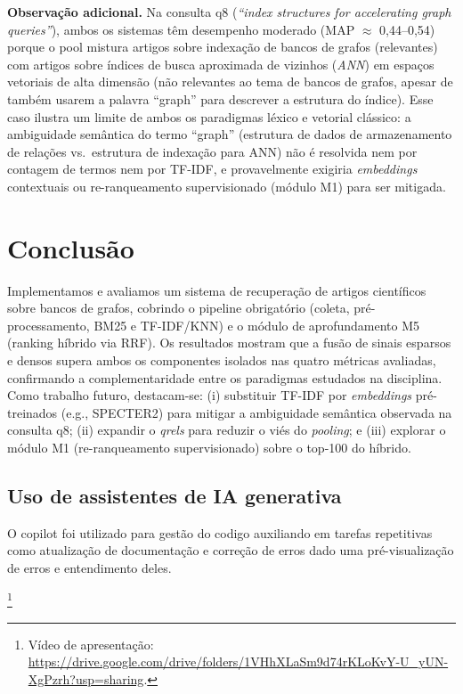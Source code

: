 \documentclass[12pt]{article}
\begin{document}
\textbf{Observação adicional.} Na consulta q8 (\textit{``index structures
for accelerating graph queries''}), ambos os sistemas têm desempenho
moderado (MAP $\approx$ 0,44--0,54) porque o pool mistura artigos sobre
indexação de bancos de grafos (relevantes) com artigos sobre índices de
busca aproximada de vizinhos (\textit{ANN}) em espaços vetoriais de alta
dimensão (não relevantes ao tema de bancos de grafos, apesar de também
usarem a palavra ``graph'' para descrever a estrutura do índice). Esse caso
ilustra um limite de ambos os paradigmas léxico e vetorial clássico: a
ambiguidade semântica do termo ``graph'' (estrutura de dados de armazenamento
de relações vs.\ estrutura de indexação para ANN) não é resolvida nem por
contagem de termos nem por TF-IDF, e provavelmente exigiria
\textit{embeddings} contextuais ou re-ranqueamento supervisionado (módulo
M1) para ser mitigada.

\section{Conclusão}

Implementamos e avaliamos um sistema de recuperação de artigos científicos
sobre bancos de grafos, cobrindo o pipeline obrigatório (coleta, pré-processamento, BM25 e TF-IDF/KNN) e o módulo de aprofundamento M5 (ranking
híbrido via RRF). Os resultados mostram que a fusão de sinais esparsos e
densos supera ambos os componentes isolados nas quatro métricas avaliadas,
confirmando a complementaridade entre os paradigmas estudados na disciplina.
Como trabalho futuro, destacam-se: (i) substituir TF-IDF por
\textit{embeddings} pré-treinados (e.g., SPECTER2) para mitigar a
ambiguidade semântica observada na consulta q8; (ii) expandir o
\textit{qrels} para reduzir o viés do \textit{pooling}; e (iii) explorar o
módulo M1 (re-ranqueamento supervisionado) sobre o top-100 do híbrido.

\subsection*{Uso de assistentes de IA generativa}

O copilot foi utilizado para gestão do codigo auxiliando em tarefas repetitivas como atualização de documentação e correção de erros
dado uma pré-visualização de erros e entendimento deles.


\footnote{Vídeo de apresentação: \url{https://drive.google.com/drive/folders/1VHhXLaSm9d74rKLoKvY-U_yUN-XgPzrh?usp=sharing}.}
\end{document}
